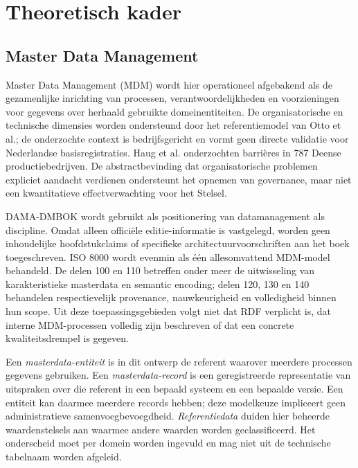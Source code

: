 \section{Theoretisch kader}
\subsection{Master Data Management}
Master Data Management (MDM) wordt hier operationeel afgebakend als de gezamenlijke inrichting van processen, verantwoordelijkheden en voorzieningen voor gegevens over herhaald gebruikte domeinentiteiten. De organisatorische en technische dimensies worden ondersteund door het referentiemodel van Otto et al.; de onderzochte context is bedrijfsgericht en vormt geen directe validatie voor Nederlandse basisregistraties. \citep{L05} Haug et al. onderzochten barrières in 787 Deense productiebedrijven. De abstractbevinding dat organisatorische problemen expliciet aandacht verdienen ondersteunt het opnemen van governance, maar niet een kwantitatieve effectverwachting voor het Stelsel. \citep{L17}

DAMA-DMBOK wordt gebruikt als positionering van datamanagement als discipline. Omdat alleen officiële editie-informatie is vastgelegd, worden geen inhoudelijke hoofdstukclaims of specifieke architectuurvoorschriften aan het boek toegeschreven. \citep{S01} ISO 8000 wordt evenmin als één allesomvattend MDM-model behandeld. De delen 100 en 110 betreffen onder meer de uitwisseling van karakteristieke masterdata en semantic encoding; delen 120, 130 en 140 behandelen respectievelijk provenance, nauwkeurigheid en volledigheid binnen hun scope. \citep{S02,S03,S04,S05,S06} Uit deze toepassingsgebieden volgt niet dat RDF verplicht is, dat interne MDM-processen volledig zijn beschreven of dat een concrete kwaliteitsdrempel is gegeven.

Een \emph{masterdata-entiteit} is in dit ontwerp de referent waarover meerdere processen gegevens gebruiken. Een \emph{masterdata-record} is een geregistreerde representatie van uitspraken over die referent in een bepaald systeem en een bepaalde versie. Een entiteit kan daarmee meerdere records hebben; deze modelkeuze impliceert geen administratieve samenvoegbevoegdheid. \emph{Referentiedata} duiden hier beheerde waardenstelsels aan waarmee andere waarden worden geclassificeerd. Het onderscheid moet per domein worden ingevuld en mag niet uit de technische tabelnaam worden afgeleid.


